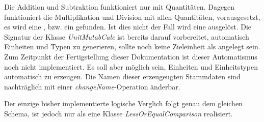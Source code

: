 Die Addition und Subtraktion funktioniert nur mit  Quantitäten. Dagegen funktioniert die Multiplikation und Division mit allen Quantitäten, vorausgesetzt, es wird eine , bzw. ein  gefunden. Ist dies nicht der Fall wird eine  ausgelöst. Die Signatur der Klasse 
\textit{UnitMutabCalc} ist bereits darauf vorbereitet, automatisch Einheiten und Typen zu generieren, sollte noch keine Zieleinheit als  angelegt sein. Zum Zeitpunkt der Fertigstellung dieser Dokumentation ist dieser Automatismus noch nicht implementiert. Es soll aber möglich sein, Einheiten und Einheitstypen automatisch zu erzeugen. Die Namen dieser erzeugeugten Stammdaten sind nachträglich mit einer \textit{changeName}-Operation änderbar.

Der einzige bisher implementierte logische Verglich  folgt genau dem gleichen Schema, ist jedoch nur als eine Klasse \textit{LessOrEqualComparison} realisiert.
